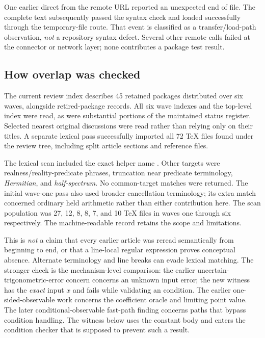 \documentclass[11pt,letterpaper]{article}
\newcommand{\code}[1]{\texttt{\small\detokenize{#1}}}
\begin{document}
One earlier direct \code{Get} from the remote URL reported an unexpected end of file. The complete text subsequently passed the syntax check and loaded successfully through the temporary-file route. That event is classified as a transfer/load-path observation, \emph{not} a repository syntax defect. Several other remote calls failed at the connector or network layer; none contributes a package test result.

\subsection{How overlap was checked}
The current review index describes 45 retained packages distributed over six waves, alongside retired-package records. All six wave indexes and the top-level index were read, as were substantial portions of the maintained status register. Selected nearest original discussions were read rather than relying only on their titles. A separate lexical pass successfully imported all 72 TeX files found under the review tree, including split article sections and reference files.\cite{reviewindex,register}

The lexical scan included the exact helper name \code{inverseFunctionConditionOnJet}. Other targets were realness/reality-predicate phrases, truncation near predicate terminology, \emph{Hermitian}, and \emph{half-spectrum}. No common-target matches were returned. The initial wave-one pass also used broader cancellation terminology; its extra match concerned ordinary held arithmetic rather than either contribution here. The scan population was 27, 12, 8, 8, 7, and 10 TeX files in waves one through six respectively. The machine-readable record retains the scope and limitations.

This is \emph{not} a claim that every earlier article was reread semantically from beginning to end, or that a line-local regular expression proves conceptual absence. Alternate terminology and line breaks can evade lexical matching. The stronger check is the mechanism-level comparison: the earlier uncertain-trigonometric-error concern concerns an unknown input error; the new witness has the \emph{exact} input \(x\) and fails while validating an \code{Element} condition. The earlier one-sided-observable work concerns the coefficient oracle and limiting point value. The later conditional-observable fast-path finding concerns paths that bypass condition handling. The witness below uses the constant body \code{1} and enters the condition checker that is supposed to prevent such a result.\cite{r4,r25,r52}
\end{document}
